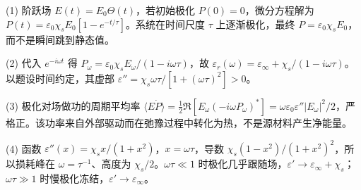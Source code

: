 (1) 阶跃场 \(E(t)=E_0\Theta(t)\)，若初始极化 \(P(0)=0\)，微分方程解为 \(P(t)=\varepsilon_0\chi_sE_0[1-e^{-t/\tau}]\)。系统在时间尺度 \(\tau\) 上逐渐极化，最终 \(P=\varepsilon_0\chi_sE_0\)，而不是瞬间跳到静态值。

(2) 代入 \(e^{-i\omega t}\) 得 \(P_\omega=\varepsilon_0\chi_sE_\omega/(1-i\omega\tau)\)，故 \(\boxed{\varepsilon_r(\omega)=\varepsilon_\infty+\chi_s/(1-i\omega\tau)}\)。以题设时间约定，其虚部 \(\varepsilon''=\chi_s\omega\tau/[1+(\omega\tau)^2]>0\)。

(3) 极化对场做功的周期平均率 \(\langle E\dot P\rangle=\frac12\Re[E_\omega(-i\omega P_\omega)^*]=\omega\varepsilon_0\varepsilon''|E_\omega|^2/2\)，严格正。该功率来自外部驱动而在弛豫过程中转化为热，不是源材料产生净能量。

(4) 函数 \(\varepsilon''(x)=\chi_s x/(1+x^2)\)，\(x=\omega\tau\)，导数 \(\chi_s(1-x^2)/(1+x^2)^2\)，所以损耗峰在 \(\omega=\tau^{-1}\)、高度为 \(\chi_s/2\)。\(\omega\tau\ll1\) 时极化几乎跟随场，\(\varepsilon'\to\varepsilon_\infty+\chi_s\)；\(\omega\tau\gg1\) 时慢极化冻结，\(\varepsilon'\to\varepsilon_\infty\)。
